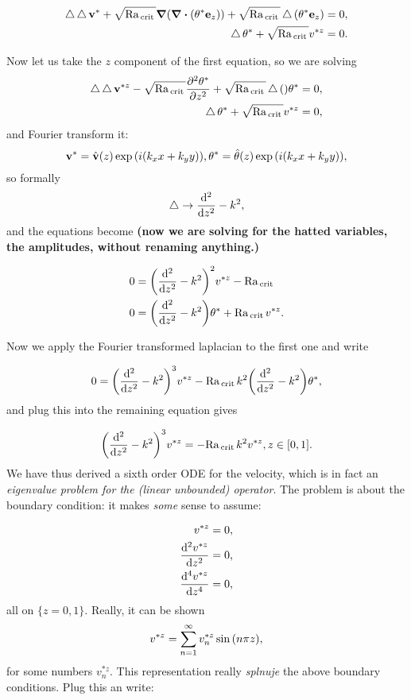 \documentclass[reqno, a4paper]{article}
\begin{document}
\begin{align*}
	\laplace \laplace \vb{v}^{*} + \sqrt{\Rayleigh_{\, \text{crit} \,}}\grad \qty(\divergence{\qty(\theta^{*} \vb{e}_z)}) + \sqrt{\Rayleigh_{\, \text{crit} \,}}\laplace\qty(\theta^{*} \vb{e}_z) &= 0, \\
	\laplace \theta^{*} + \sqrt{\Rayleigh_{\, \text{crit} \,}} v^{*z} &= 0.
\end{align*}

Now let us take the $z$ component of the first equation, so we are solving
\begin{align*}
	\operatorname{\bigtriangleup} \operatorname{\bigtriangleup} \vb{v}^{*z} - \sqrt{\mathrm{Ra}_{\, \text{crit} \,}}\pdv[2]{\theta^{*}}{z}  + \sqrt{\mathrm{Ra}_{\, \text{crit} \,}}\operatorname{\bigtriangleup}\qty\theta^{*}  &= 0, \\
	\operatorname{\bigtriangleup} \theta^{*} + \sqrt{\mathrm{Ra}_{\, \text{crit} \,}} v^{*z} &= 0,
\end{align*}
and Fourier transform it:
\[
	\vb{v}^{*} = \hat{\vb{v}}(z) \exp\qty(i(k_x x + k_y y)), \theta^{*} = \hat{\theta}(z) \exp\qty(i(k_x x+ k_y y)),
\]
so formally
\[
	\operatorname{\bigtriangleup} \to \dv[2]{z} - k^{2},
\]
and the equations become \textbf{(now we are solving for the hatted variables, the amplitudes, without renaming anything.)}

\begin{align}
\label{eq:eqn_transformed}
0 &= \qty(\dv[2]{z}-k^{2})^{2} v^{*z} - \mathrm{Ra}_{\, \text{crit} \,} \\
		0 &= \qty(\dv[2]{z}-k^{2})\theta^{*} + \mathrm{Ra}_{\, \text{crit} \,} v^{*z}.
\end{align}

Now we apply the Fourier transformed laplacian to the first one and write

\[
	0 = \qty(\dv[2]{z}-k^{2})^{3} v^{*z}- \mathrm{Ra}_{\, \text{crit} \,} k^{2}\qty(\dv[2]{z}-k^{2})\theta^{*},
\]
and plug this into the remaining equation gives

\[
	\qty(\dv[2]{z}-k^{2})^{3} v^{*z} = - \mathrm{Ra}_{\, \text{crit} \,}k^{2} v^{*z}, z \in [0,1].
\]
We have thus derived a sixth order ODE for the velocity, which is in fact an \textit{eigenvalue problem for the (linear unbounded) operator}. The problem is about the boundary condition: it makes \textit{some} sense to assume:

\begin{align*}
	v^{*z} &= 0, \\
	\dv[2]{v^{*z}}{z} &= 0,\\
	\dv[4]{v^{*z}}{z} &= 0,
\end{align*}
all on $\{z = 0,1\}.$ Really, it can be shown
\[
	v^{*z} = \sum_{n=1}^{\infty}v_n^{*z}\sin\qty(n \pi z),
\]
for some numbers $v_n^{*z}.$ This representation really \textit{splnuje} the above boundary conditions. Plug this an write:
\end{document}

